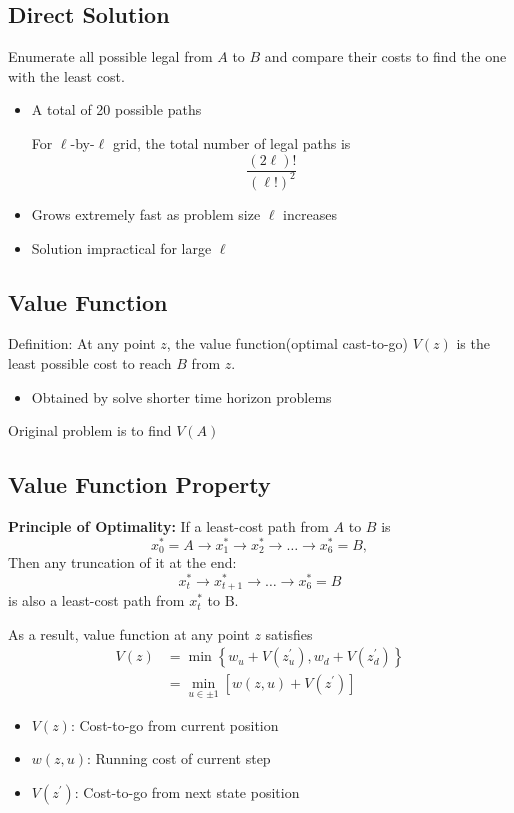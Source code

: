 \documentclass[10pt,a4paper,oneside]{article}
\begin{document}
\subsection{Direct Solution}
Enumerate all possible legal from $A$ to $B$ and compare their costs to find the one with the least cost.
\begin{itemize}
	\item A total of 20 possible paths
	
	For $\ell$-by-$\ell$ grid, the total number of legal paths is
	$$
	\frac{(2 \ell) !}{(\ell !)^{2}}
	$$
	\item Grows extremely fast as problem size $\ell$ increases
	\item Solution impractical for large $\ell$
\end{itemize}
\subsection{Value Function}
Definition: At any point $z$, the value function(optimal cast-to-go) $V(z)$ is the least possible cost to reach $B$ from $z$.
\begin{itemize}
	\item Obtained by solve shorter time horizon problems
\end{itemize}
Original problem is to find $V(A)$
\subsection{Value Function Property}
{\bfseries Principle of Optimality: }If a least-cost path from $A$ to $B$ is
\[
x^*_0=A\rightarrow x^*_1\rightarrow x^*_2\rightarrow\dots\rightarrow x^*_6=B,
\]
Then any truncation of it at the end:
\[
x^*_t\rightarrow x^*_{t+1}\rightarrow \dots \rightarrow x^*_6=B
\]
is also a least-cost path from $x^*_t$ to B.

\noindent As a result, value function at any point $z$ satisfies
$$
\begin{aligned} V(z) &=\min \left\{w_{u}+V\left(z_{u}^{\prime}\right), w_{d}+V\left(z_{d}^{\prime}\right)\right\} \\ &=\min _{u \in \pm 1}\left[w(z, u)+V\left(z^{\prime}\right)\right] \end{aligned}
$$
\begin{itemize}
	\item $V(z)$: Cost-to-go from current position
	\item $w(z,u)$: Running cost of current step
	\item $V(z^{\prime})$: Cost-to-go from next state position
\end{itemize}
\end{document}
